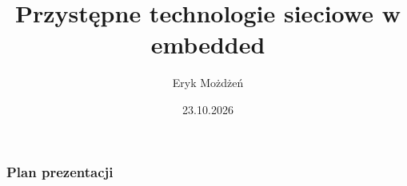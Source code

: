 \documentclass[xcolor=dvipsnames]{beamer}%
\title[Technologie sieciowe w embedded]{Przystępne technologie sieciowe w embedded}
\institute[KoNaR]{Koło Naukowe Robotyków KoNaR}
\author[Eryk Możdżeń]{Eryk Możdżeń}
\date{23.10.2026}
\begin{document}
    \begin{frame}
        \titlepage
    \end{frame}

    \begin{frame}
        \frametitle{Plan prezentacji}
        \tableofcontents
    \end{frame}

    
    
    
    
    
    
    
\end{document}
